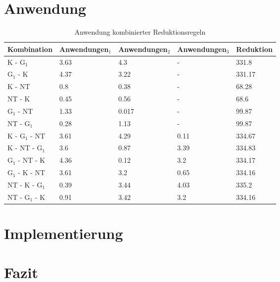 \documentclass{beamer}
\begin{document}
	\section{Anwendung}
	\begin{frame}{}
	\begin{table}[htbp]
\caption{Anwendung kombinierter Reduktionsregeln\label{tab:kombination}}
\vspace*{1em}
\centering

\bgroup
\def\arraystretch{1.3}%
\tiny
\begin{tabular}[c]{l|l|l|l|l}

	
	\multicolumn{1}{c|}{\textbf{Kombination}} &
	\multicolumn{1}{c|}{\textbf{Anwendungen$_{1}$}} &
	\multicolumn{1}{c|}{\textbf{Anwendungen$_{2}$}} &
	\multicolumn{1}{c|}{\textbf{Anwendungen$_{3}$}} & 
	\multicolumn{1}{c}{\textbf{Reduktion}} \\
	\hline

	K - G$_{1}$ & 3.63 & 4.3 & - &331.8\\
	G$_{1}$ - K & 4.37 & 3.22 & - &331.17\\
	K - NT & 0.8 & 0.38 & - & 68.28 \\
	NT - K & 0.45 & 0.56 & - & 68.6\\
	G$_{1}$ - NT & 1.33 & 0.017 & - & 99.87\\
	NT - G$_{1}$ & 0.28 & 1.13 & - & 99.87\\
	K  - G$_{1}$ - NT & 3.61 & 4.29 & 0.11 & 334.67 \\
	K - NT - G$_{1}$ & 3.6 & 0.87 & 3.39 & 334.83 \\
	G$_{1}$ - NT - K & 4.36 & 0.12 & 3.2 & 334.17 \\
	G$_{1}$ - K - NT & 3.61 & 3.2 & 0.65 & 334.16 \\
	NT - K - G$_{1}$ & 0.39 & 3.44 & 4.03 & 335.2 \\
	NT - G$_{1}$ - K & 0.91 & 3.42 & 3.2 & 334.16 \\

	
\end{tabular}

\egroup

\end{table}
	\end{frame}
	
	\section{Implementierung}
	\begin{frame}{}
	\end{frame}
	
	\section{Fazit}
	\begin{frame}{}
	\end{frame}
  
\end{document}
